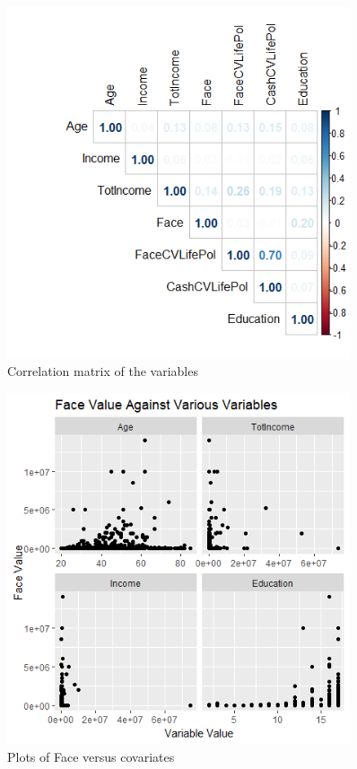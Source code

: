\documentclass[12pt, twoside,hidelinks]{article}
\theoremstyle{definition}
\numberwithin{equation}{section}
\begin{document}
\newpage
\begin{figure}[ht!]
    \centering
    \includegraphics[width=0.9\textwidth]{visuals/InsuranceVisuals/UsTermCorr.png}
    \caption{Correlation matrix of the variables}
    \label{fig:cor_variables}
\end{figure}
\newpage
\begin{figure}[ht!]
    \centering
    \includegraphics[width=0.9\textwidth]{visuals/InsuranceVisuals/FaceValueVcovariates.png}
    \caption{Plots of Face versus covariates}
    \label{fig:FaceVscovariates}
\end{figure}
\end{document}
